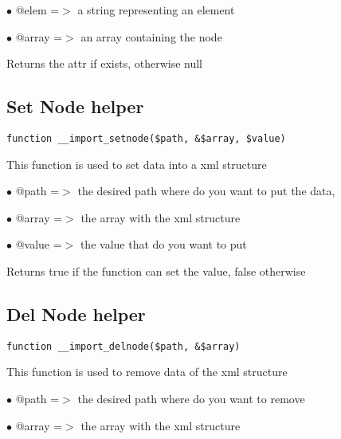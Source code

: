\documentclass[a4paper]{book}
\begin{document}
\begin{compactitem}
\item[\color{myblue}$\bullet$] @elem  =$>$ a string representing an element
\item[\color{myblue}$\bullet$] @array =$>$ an array containing the node
\end{compactitem}

Returns the attr if exists, otherwise null

\hypertarget{toc149}{}
\subsection{Set Node helper}

\begin{lstlisting}
function __import_setnode($path, &$array, $value)
\end{lstlisting}

This function is used to set data into a xml structure

\begin{compactitem}
\item[\color{myblue}$\bullet$] @path  =$>$ the desired path where do you want to put the data,
\item[\color{myblue}$\bullet$] @array =$>$ the array with the xml structure
\item[\color{myblue}$\bullet$] @value =$>$ the value that do you want to put
\end{compactitem}

Returns true if the function can set the value, false otherwise

\hypertarget{toc150}{}
\subsection{Del Node helper}

\begin{lstlisting}
function __import_delnode($path, &$array)
\end{lstlisting}

This function is used to remove data of the xml structure

\begin{compactitem}
\item[\color{myblue}$\bullet$] @path  =$>$ the desired path where do you want to remove
\item[\color{myblue}$\bullet$] @array =$>$ the array with the xml structure
\end{compactitem}
\end{document}

